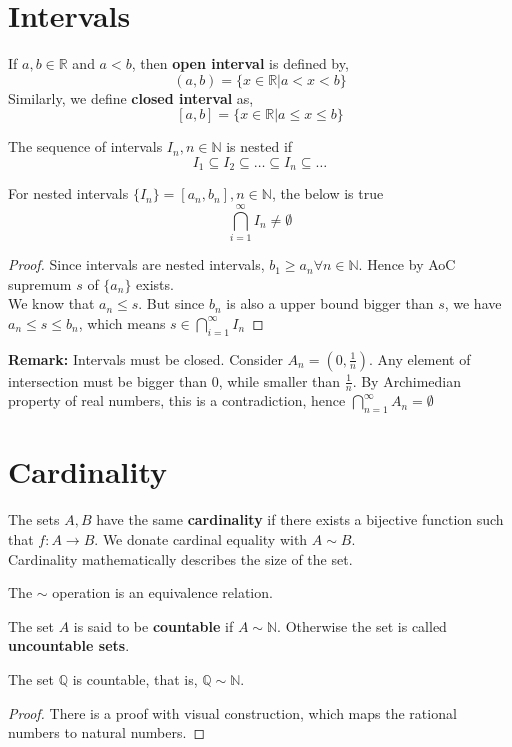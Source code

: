 \section{Intervals}
\begin{theorem}
    If $a,b \in \mathbb{R}$ and $a<b$, then \textbf{open interval} is defined by,
    \[ (a,b) = \{ x \in \mathbb{R}| a < x < b\}\]
    Similarly, we define \textbf{closed interval} as,
    \[ [a,b] = \{ x \in \mathbb{R}| a \le x \le b\} \]
\end{theorem}
\begin{theorem}The sequence of intervals $I_n, n \in \mathbb{N}$ is nested if
    \[ I_1 \subseteq I_2 \subseteq \ldots \subseteq I_n \subseteq \ldots \]
    \end{theorem}
\begin{theorem}
    For nested intervals $\{ I_n\} = [a_n, b_n],n \in \mathbb{N}$, the below is true
        \[ \bigcap_{i=1}^{\infty}I_n \neq \emptyset \]
    \begin{proof}
        Since intervals are nested intervals, $b_1 \ge a_n \forall n \in \mathbb{N}$. Hence by AoC supremum $s$ of $\{ a_n\}$ exists.
        \\
        We know that $a_n \le s$. But since $b_n$ is also a upper bound bigger than $s$, we have $a_n \le s \le b_n$, which means $s \in  \bigcap_{i=1}^{\infty}I_n$
    \end{proof}
    \textbf{Remark:} Intervals must be closed. Consider $A_n = (0, \frac{1}{n})$. Any element of intersection must be bigger than $0$, while smaller than $\frac{1}{n}$. By Archimedian property of real numbers, this is a contradiction, hence $\bigcap_{n=1}^{\infty}A_n = \emptyset$
\end{theorem}
\section{Cardinality}
\begin{definition}
    The sets $A,B$ have the same \textbf{cardinality} if there exists a bijective function such that $f: A \rightarrow B$. We donate cardinal equality with $A \sim B$. \\
    Cardinality mathematically describes the size of the set. 

    The $\sim$ operation is an equivalence relation.
\end{definition}
\begin{definition} The set $A$ is said to be \textbf{countable} if $A \sim \mathbb{N}$. Otherwise the set is called \textbf{uncountable sets}.
\end{definition}
\begin{theorem} The set $\mathbb{Q}$ is countable, that is, $\mathbb{Q} \sim \mathbb{N}$.
    \begin{proof}
        There is a proof with visual construction, which maps the rational numbers to natural numbers. 
    \end{proof}
\end{theorem}

